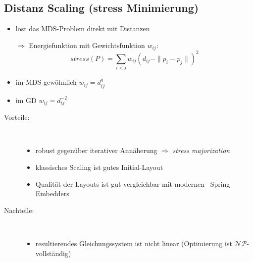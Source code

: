 \subsection{Distanz Scaling (stress Minimierung)}
\begin{itemize}
	\item löst das MDS-Problem direkt mit Distanzen
	\item[$\Rightarrow$] Energiefunktion mit Gewichtsfunktion $w_{ij}$: \[stress(P)=\sum\limits_{i<j}w_{ij}(d_{ij}-\|p_i-p_j\|)^2\]
	\item im MDS gewöhnlich $w_{ij}=d_{ij}^q$
	\item im GD $w_{ij}=d_{ij}^{-2}$
\end{itemize}
\begin{description}
	\item[Vorteile:]\ \\\vspace*{-\baselineskip}
		\begin{itemize}
			\item robust gegenüber iterativer Annäherung $\Rightarrow$ \textit{stress majorization}
			\item klassisches Scaling ist gutes Initial-Layout
			\item Qualität der Layouts ist gut vergleichbar mit \glqq modernen\grqq~ Spring Embedders
		\end{itemize}
	\item[Nachteile:]\ \\\vspace*{-\baselineskip}
		\begin{itemize}
			\item resultierendes Gleichungssystem ist nicht linear (Optimierung ist $\mathcal{NP}$-vollständig)
		\end{itemize}
\end{description}